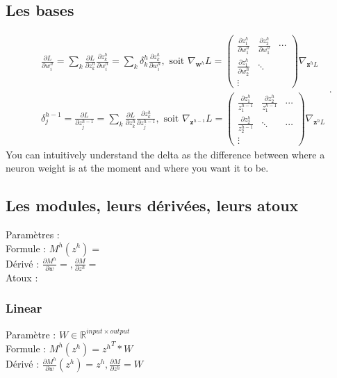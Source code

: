 \documentclass{article}
\begin{document}
\begin{multicols}{2}
\subsection{Les bases}
\[
    \begin{aligned}
        & \frac{\partial L}{\partial w_i^h}=\sum_k \frac{\partial L}{\partial z_k^h} \frac{\partial z_k^h}{\partial w_i^h}=\sum_k \delta_k^h \frac{\partial z_k^h}{\partial w_i^h}, \text { soit } \nabla_{\mathbf{w}^h} L=\left(\begin{array}{ccc}
            \frac{\partial z_1^h}{\partial w_1^h} & \frac{\partial z_2^h}{\partial w_1^h} & \cdots \\
            \frac{\partial z_1^h}{\partial w_2^h} & \ddots & \\
            \vdots & &
        \end{array}\right) \nabla_{\mathbf{z}^h L} \\
        & \delta_j^{h-1}=\frac{\partial L}{\partial z_j^{h-1}}=\sum_k \frac{\partial L}{\partial z_k^h} \frac{\partial z_k^h}{\partial z_j^{h-1}}, \text { soit } \nabla_{\mathbf{z}^{h-1}} L=\left(\begin{array}{ccc}
            \frac{\partial z_1^h}{z_1^{h-1}} & \frac{\partial z_2^h}{z_1^{h-1}} & \cdots \\
            \frac{\partial z_2^h}{z_2^{h-1}} & \ddots & \cdots \\
        \vdots &
        \end{array}\right) \nabla_{\mathbf{z}^h L}
    \end{aligned}
.\]
You can intuitively understand the delta as the difference between where a neuron weight is at the moment and where you want it to be.

\subsection{Les modules, leurs dérivées, leurs atoux}

\begin{multicols}{2}
Paramètres : \\
Formule : $ M^h(z^h) =  $ \\
Dérivé : $ \frac{\partial M^h}{\partial w} = , \frac{\partial M}{\partial z^h} = $ \\
Atoux : 


\subsubsection{Linear}
Paramètre : $ W \in \mathbb{R}^{input \times output} $ \\
Formule : $ M^h(z^h) =  {z^h}^T * W $ \\
Dérivé : $ \frac{\partial M^h}{\partial w}(z^h) = z^h, \frac{\partial M}{\partial z^h} = W $ \\


\end{multicols}
\end{multicols}
\end{document}

